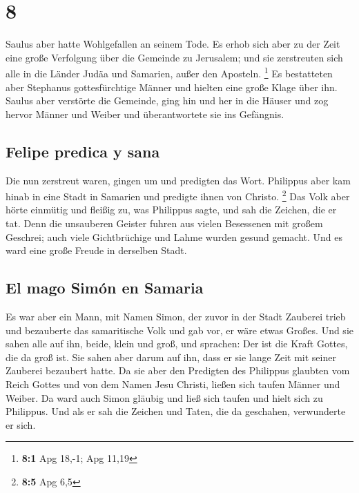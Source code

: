 \hypertarget{section-7}{%
\section{8}\label{section-7}}

 Saulus aber hatte Wohlgefallen an seinem Tode. Es erhob
sich aber zu der Zeit eine große Verfolgung über die Gemeinde zu
Jerusalem; und sie zerstreuten sich alle in die Länder Judäa und
Samarien, außer den Aposteln. \footnote{\textbf{8:1} Apg 18,-1; Apg
  11,19}  Es bestatteten aber Stephanus gottesfürchtige
Männer und hielten eine große Klage über ihn.  Saulus aber
verstörte die Gemeinde, ging hin und her in die Häuser und zog hervor
Männer und Weiber und überantwortete sie ins Gefängnis.

\hypertarget{felipe-predica-y-sana}{%
\subsection{Felipe predica y sana}\label{felipe-predica-y-sana}}

 Die nun zerstreut waren, gingen um und predigten das
Wort.  Philippus aber kam hinab in eine Stadt in Samarien
und predigte ihnen von Christo. \footnote{\textbf{8:5} Apg 6,5}
 Das Volk aber hörte einmütig und fleißig zu, was
Philippus sagte, und sah die Zeichen, die er tat.  Denn
die unsauberen Geister fuhren aus vielen Besessenen mit großem Geschrei;
auch viele Gichtbrüchige und Lahme wurden gesund gemacht. 
Und es ward eine große Freude in derselben Stadt.

\hypertarget{el-mago-simuxf3n-en-samaria}{%
\subsection{El mago Simón en
Samaria}\label{el-mago-simuxf3n-en-samaria}}

 Es war aber ein Mann, mit Namen Simon, der zuvor in der
Stadt Zauberei trieb und bezauberte das samaritische Volk und gab vor,
er wäre etwas Großes.  Und sie sahen alle auf ihn, beide,
klein und groß, und sprachen: Der ist die Kraft Gottes, die da groß ist.
 Sie sahen aber darum auf ihn, dass er sie lange Zeit mit
seiner Zauberei bezaubert hatte.  Da sie aber den
Predigten des Philippus glaubten vom Reich Gottes und von dem Namen Jesu
Christi, ließen sich taufen Männer und Weiber.  Da ward
auch Simon gläubig und ließ sich taufen und hielt sich zu Philippus. Und
als er sah die Zeichen und Taten, die da geschahen, verwunderte er sich.

